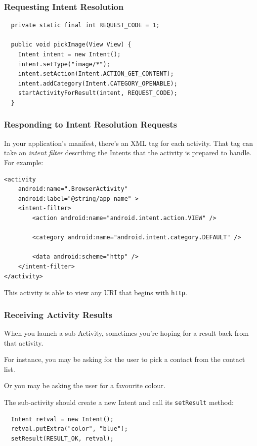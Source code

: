 \begin{frame}[fragile]
\frametitle{Requesting Intent Resolution}
\begin{changemargin}{1cm}

{\small 
\begin{lstlisting}
  private static final int REQUEST_CODE = 1;

  public void pickImage(View View) {
    Intent intent = new Intent();
    intent.setType("image/*");
    intent.setAction(Intent.ACTION_GET_CONTENT);
    intent.addCategory(Intent.CATEGORY_OPENABLE);
    startActivityForResult(intent, REQUEST_CODE);
  }
\end{lstlisting}
}


\end{changemargin}
\end{frame}

\begin{frame}[fragile]
\frametitle{Responding to Intent Resolution Requests}
\begin{changemargin}{1cm}

In your application's manifest, there's an XML tag for each activity.
That tag can take an \emph{intent filter} describing the Intents
that the activity is prepared to handle. For example:
{\scriptsize 
\begin{verbatim}
<activity
    android:name=".BrowserActivity"
    android:label="@string/app_name" >
    <intent-filter>
        <action android:name="android.intent.action.VIEW" />

        <category android:name="android.intent.category.DEFAULT" />

        <data android:scheme="http" />
    </intent-filter>
</activity>
\end{verbatim}
}
This activity is able to view any URI that begins with {\tt http}.


\end{changemargin}
\end{frame}

\begin{frame}[fragile]
\frametitle{Receiving Activity Results}
\begin{changemargin}{1cm}

When you launch a sub-Activity, sometimes you're hoping for a result
back from that activity. 

For instance, you may be asking for the
user to pick a contact from the contact list. 

Or you may be asking the
user for a favourite colour. 

The sub-activity should
create a new Intent and call its {\tt setResult} method:

{\scriptsize 
\begin{lstlisting}
  Intent retval = new Intent();
  retval.putExtra("color", "blue");
  setResult(RESULT_OK, retval);
\end{lstlisting}
}


\end{changemargin}
\end{frame}


